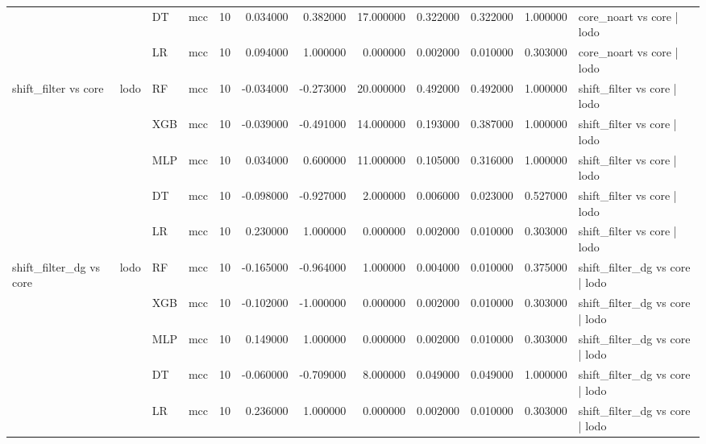 \begin{tabular}{llllrrrrrrrl}
 &  & DT & mcc & 10 & 0.034000 & 0.382000 & 17.000000 & 0.322000 & 0.322000 & 1.000000 & core_noart vs core | lodo \\
 &  & LR & mcc & 10 & 0.094000 & 1.000000 & 0.000000 & 0.002000 & 0.010000 & 0.303000 & core_noart vs core | lodo \\
\cline{1-12} \cline{2-12}
\multirow[t]{5}{*}{shift_filter vs core} & \multirow[t]{5}{*}{lodo} & RF & mcc & 10 & -0.034000 & -0.273000 & 20.000000 & 0.492000 & 0.492000 & 1.000000 & shift_filter vs core | lodo \\
 &  & XGB & mcc & 10 & -0.039000 & -0.491000 & 14.000000 & 0.193000 & 0.387000 & 1.000000 & shift_filter vs core | lodo \\
 &  & MLP & mcc & 10 & 0.034000 & 0.600000 & 11.000000 & 0.105000 & 0.316000 & 1.000000 & shift_filter vs core | lodo \\
 &  & DT & mcc & 10 & -0.098000 & -0.927000 & 2.000000 & 0.006000 & 0.023000 & 0.527000 & shift_filter vs core | lodo \\
 &  & LR & mcc & 10 & 0.230000 & 1.000000 & 0.000000 & 0.002000 & 0.010000 & 0.303000 & shift_filter vs core | lodo \\
\cline{1-12} \cline{2-12}
\multirow[t]{5}{*}{shift_filter_dg vs core} & \multirow[t]{5}{*}{lodo} & RF & mcc & 10 & -0.165000 & -0.964000 & 1.000000 & 0.004000 & 0.010000 & 0.375000 & shift_filter_dg vs core | lodo \\
 &  & XGB & mcc & 10 & -0.102000 & -1.000000 & 0.000000 & 0.002000 & 0.010000 & 0.303000 & shift_filter_dg vs core | lodo \\
 &  & MLP & mcc & 10 & 0.149000 & 1.000000 & 0.000000 & 0.002000 & 0.010000 & 0.303000 & shift_filter_dg vs core | lodo \\
 &  & DT & mcc & 10 & -0.060000 & -0.709000 & 8.000000 & 0.049000 & 0.049000 & 1.000000 & shift_filter_dg vs core | lodo \\
 &  & LR & mcc & 10 & 0.236000 & 1.000000 & 0.000000 & 0.002000 & 0.010000 & 0.303000 & shift_filter_dg vs core | lodo \\
\cline{1-12} \cline{2-12}
\bottomrule
\end{tabular}
